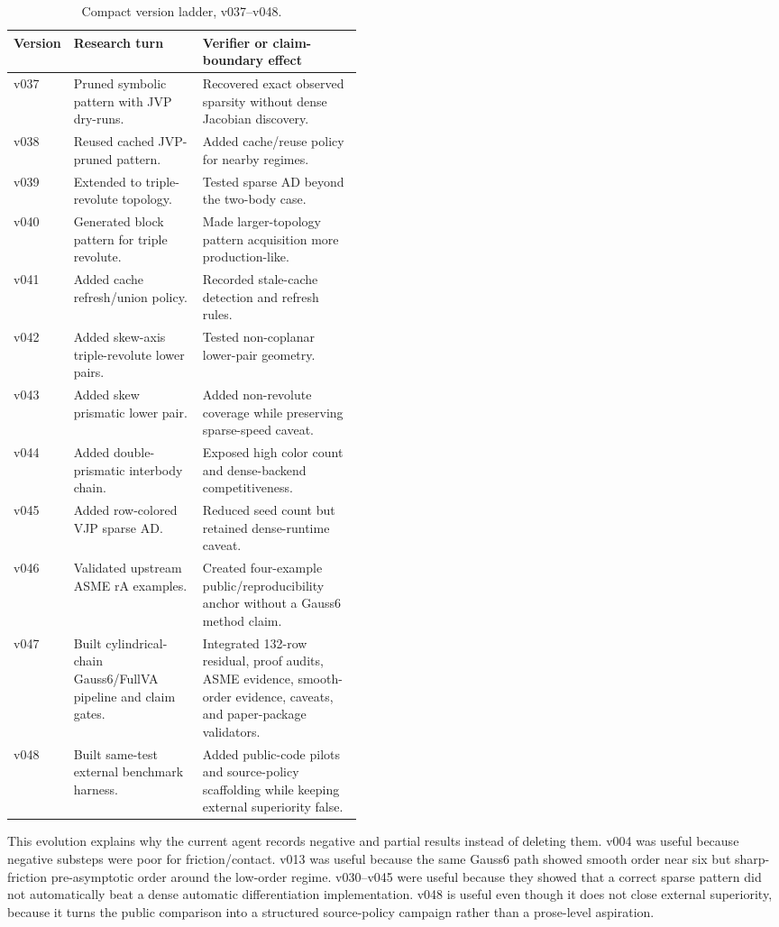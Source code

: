 \documentclass[10pt]{article}
\newcommand{\method}{Gauss6/FullVA}
\begin{document}
\begin{table}[H]
\centering
\caption{Compact version ladder, v037--v048.}
\label{tab:version_ladder_d}
\scriptsize
\begin{tabularx}{\linewidth}{p{0.08\linewidth}p{0.37\linewidth}Y}
\toprule
\textbf{Version} & \textbf{Research turn} & \textbf{Verifier or claim-boundary effect} \\
\midrule
v037 & Pruned symbolic pattern with JVP dry-runs. & Recovered exact observed sparsity without dense Jacobian discovery. \\
v038 & Reused cached JVP-pruned pattern. & Added cache/reuse policy for nearby regimes. \\
v039 & Extended to triple-revolute topology. & Tested sparse AD beyond the two-body case. \\
v040 & Generated block pattern for triple revolute. & Made larger-topology pattern acquisition more production-like. \\
v041 & Added cache refresh/union policy. & Recorded stale-cache detection and refresh rules. \\
v042 & Added skew-axis triple-revolute lower pairs. & Tested non-coplanar lower-pair geometry. \\
v043 & Added skew prismatic lower pair. & Added non-revolute coverage while preserving sparse-speed caveat. \\
v044 & Added double-prismatic interbody chain. & Exposed high color count and dense-backend competitiveness. \\
v045 & Added row-colored VJP sparse AD. & Reduced seed count but retained dense-runtime caveat. \\
v046 & Validated upstream ASME rA examples. & Created four-example public/reproducibility anchor without a Gauss6 method claim. \\
v047 & Built cylindrical-chain \method{} pipeline and claim gates. & Integrated 132-row residual, proof audits, ASME evidence, smooth-order evidence, caveats, and paper-package validators. \\
v048 & Built same-test external benchmark harness. & Added public-code pilots and source-policy scaffolding while keeping external superiority false. \\
\bottomrule
\end{tabularx}
\end{table}

This evolution explains why the current agent records negative and partial
results instead of deleting them. v004 was useful because negative substeps
were poor for friction/contact. v013 was useful because the same Gauss6 path
showed smooth order near six but sharp-friction pre-asymptotic order around
the low-order regime. v030--v045 were useful because they showed that a
correct sparse pattern did not automatically beat a dense automatic
differentiation implementation. v048 is useful even though it does not close
external superiority, because it turns the public comparison into a structured
source-policy campaign rather than a prose-level aspiration.
\end{document}
